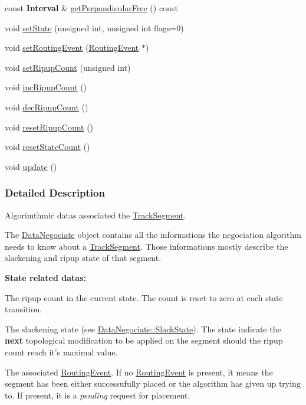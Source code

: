\begin{DoxyCompactItemize}
const {\bf Interval} \& \hyperlink{classKite_1_1DataNegociate_adcfee3417e714417cef2fc3e3835352f}{get\-Perpandicular\-Free} () const 
\item 
void \hyperlink{classKite_1_1DataNegociate_aafc8cd0dcd351625a12904bed7d5a7d1}{set\-State} (unsigned int, unsigned int flags=0)
\item 
void \hyperlink{classKite_1_1DataNegociate_a044867f105053d6231ab13fee23ec7b0}{set\-Routing\-Event} (\hyperlink{classKite_1_1RoutingEvent}{Routing\-Event} $\ast$)
\item 
void \hyperlink{classKite_1_1DataNegociate_a45492835bdca93f4e656dcd7ed027825}{set\-Ripup\-Count} (unsigned int)
\item 
void \hyperlink{classKite_1_1DataNegociate_ae50c33d207171246319e11e0671bc706}{inc\-Ripup\-Count} ()
\item 
void \hyperlink{classKite_1_1DataNegociate_a4f94572b3541ea2d150c75bedc8364ed}{dec\-Ripup\-Count} ()
\item 
void \hyperlink{classKite_1_1DataNegociate_a00a11ad9089d2df7b290615921e0c96a}{reset\-Ripup\-Count} ()
\item 
void \hyperlink{classKite_1_1DataNegociate_af1e8d229bb1dfcff3151d44d42a8549b}{reset\-State\-Count} ()
\item 
void \hyperlink{classKite_1_1DataNegociate_ac5c54df7ed3b930268c8d7752c101725}{update} ()
\end{DoxyCompactItemize}


\subsubsection{Detailed Description}
Algorimthmic datas associated the \hyperlink{classKite_1_1TrackSegment}{Track\-Segment}. 

The \hyperlink{classKite_1_1DataNegociate}{Data\-Negociate} object contains all the informations the negociation algorithm needs to know about a \hyperlink{classKite_1_1TrackSegment}{Track\-Segment}. Those informations mostly describe the slackening and ripup state of that segment.

{\bfseries State related datas\-:}
\begin{DoxyItemize}
\item The ripup count in the current state. The count is reset to zero at each state transition.
\item The slackening state (see \hyperlink{classKite_1_1DataNegociate_ab7ccb6fc1f298728995250a3bbcf18c7}{Data\-Negociate\-::\-Slack\-State}). The state indicate the {\bfseries next} topological modification to be applied on the segment should the ripup count reach it's maximal value.
\item The associated \hyperlink{classKite_1_1RoutingEvent}{Routing\-Event}. If no \hyperlink{classKite_1_1RoutingEvent}{Routing\-Event} is present, it means the segment has been either successufully placed or the algorithm has given up trying to. If present, it is a {\itshape pending} request for placement.
\end{DoxyItemize}

